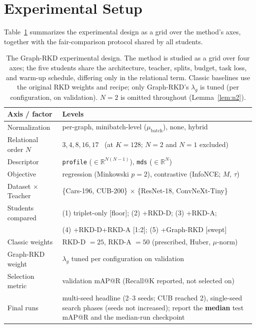 \documentclass[11pt,letterpaper]{article}
\begin{document}
\section{Experimental Setup}
\label{sec:setup}

Table~\ref{tab:design-grid} summarizes the experimental design as a grid over the
method's axes, together with the fair-comparison protocol shared by all students.

\begin{table}[htbp]
    \centering
    \small
    \caption{The Graph-RKD experimental design. The method is studied as a grid over
             four axes; the five students share the architecture, teacher, splits,
             budget, task loss, and warm-up schedule, differing only in the relational
             term. Classic baselines use the original RKD weights and recipe; only
             Graph-RKD's $\lambda_g$ is tuned (per configuration, on validation). $N=2$
             is omitted throughout (Lemma~\ref{lem:n2}).}
    \label{tab:design-grid}
    \begin{tabularx}{\textwidth}{l X}
        \toprule
        Axis / factor & Levels \\
        \midrule
        Normalization & per-graph, minibatch-level ($\mu_{\text{batch}}$), none, hybrid \\
        Relational order $N$ & $3, 4, 8, 16, 17$ \ (at $K{=}128$; $N{=}2$ and $N{=}1$ excluded) \\
        Descriptor & \texttt{profile} ($\in\mathbb{R}^{N(N-1)}$), \texttt{mds} ($\in\mathbb{R}^{N}$) \\
        Objective & regression (Minkowski $p{=}2$), contrastive (InfoNCE; $M$, $\tau$) \\
        Dataset $\times$ Teacher & \{Cars-196, CUB-200\} $\times$ \{ResNet-18, ConvNeXt-Tiny\} \\
        \midrule
        Students compared & (1) triplet-only [floor]; (2) +RKD-D; (3) +RKD-A; \\
                          & (4) +RKD-D+RKD-A [1:2]; (5) +Graph-RKD [swept] \\
        Classic weights & RKD-D $=25$, RKD-A $=50$ (prescribed, Huber, $\mu$-norm) \\
        Graph-RKD weight & $\lambda_g$ tuned per configuration on validation \\
        Selection metric & validation mAP@R (Recall@K reported, not selected on) \\
        Final runs & multi-seed headline (2--3 seeds; CUB reached 2), single-seed search phases (seeds not increased); report the \textbf{median} test mAP@R and the median-run checkpoint \\
        \bottomrule
    \end{tabularx}
\end{table}
\end{document}
